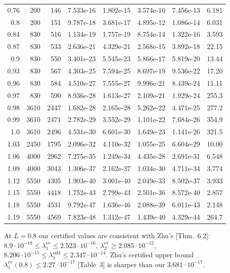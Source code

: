 \documentclass[11pt]{amsart}
\newcommand{\ev}{\mathrm{ev}}
\newcommand{\od}{\mathrm{odd}}
\newcommand{\e}[1]{\cdot 10^{#1}}
\theoremstyle{definition}
\theoremstyle{remark}
\numberwithin{equation}{section}
\begin{document}
\begin{table}[ht]
\begin{tabular}{rrrllllr}
0.76 & 200 & 146 & 7.533e-16 & 1.802e-15 & 3.574e-10 & 7.456e-13 & 6.181\\
0.8 & 200 & 151 & 9.787e-18 & 3.681e-17 & 4.895e-12 & 1.086e-14 & 6.031\\
0.84 & 830 & 516 & 1.134e-19 & 1.757e-19 & 8.754e-14 & 1.322e-16 & 3.593\\
0.87 & 830 & 533 & 2.636e-21 & 4.329e-21 & 2.568e-15 & 3.892e-18 & 22.15\\
0.9 & 830 & 550 & 3.401e-23 & 5.545e-23 & 5.866e-17 & 5.819e-20 & 13.44\\
0.93 & 830 & 567 & 4.303e-25 & 7.594e-25 & 8.697e-19 & 9.536e-22 & 17.20\\
0.96 & 830 & 584 & 4.510e-27 & 7.555e-27 & 9.996e-21 & 8.439e-24 & 11.11\\
0.97 & 830 & 590 & 8.936e-28 & 1.613e-27 & 2.109e-21 & 1.929e-24 & 255.3\\
0.98 & 3610 & 2447 & 1.682e-28 & 2.165e-28 & 5.262e-22 & 4.471e-25 & 277.2\\
0.99 & 3610 & 2471 & 2.782e-29 & 3.552e-29 & 1.101e-22 & 7.684e-26 & 354.9\\
1.0 & 3610 & 2496 & 4.531e-30 & 6.601e-30 & 1.649e-23 & 1.141e-26 & 321.5\\
1.03 & 2450 & 1795 & 2.096e-32 & 4.110e-32 & 1.055e-25 & 6.604e-29 & 10.00\\
1.06 & 4000 & 2962 & 7.275e-35 & 1.249e-34 & 4.435e-28 & 2.691e-31 & 6.548\\
1.09 & 4000 & 3043 & 1.306e-37 & 2.162e-37 & 1.034e-30 & 4.711e-34 & 3.774\\
1.12 & 5550 & 4305 & 1.903e-40 & 3.001e-40 & 2.049e-33 & 8.502e-37 & 3.933\\
1.15 & 5550 & 4418 & 1.752e-43 & 2.799e-43 & 2.501e-36 & 8.572e-40 & 2.857\\
1.18 & 5550 & 4531 & 9.792e-47 & 1.636e-46 & 2.088e-39 & 6.011e-43 & 2.148\\
1.19 & 5550 & 4569 & 7.823e-48 & 1.312e-47 & 1.439e-40 & 4.329e-44 & 264.7\\
\bottomrule
\end{tabular}
\end{table}

At $L=0.8$ our certified values are consistent with Zhu's [Thm.~6.2]: $8.9\e{-18}\le\lambda_1^\ev\le2.523\e{-16}$, $\lambda_2^\ev\ge2.085\e{-12}$, $8.206\e{-15}\le\lambda_1^\od\le2.347\e{-14}$. Zhu's certified upper bound $\lambda_1^\ev(0.8)\le2.27\e{-17}$ [Table~3] is sharper than our $3.681\e{-17}$.
\end{document}
